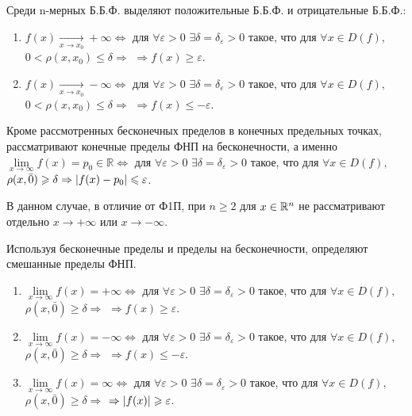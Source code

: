 Среди n-мерных Б.Б.Ф. выделяют положительные Б.Б.Ф. и отрицательные Б.Б.Ф.:
\begin{enumerate}
	\item $f(x) \xrightarrow[x \to x_0]{} +\infty \Leftrightarrow $ для $\forall \varepsilon > 0$ $\exists \delta = \delta_{\varepsilon} > 0$ такое, что для $\forall x \in D(f),$  $0 < \rho(x, x_0) \leqslant \delta \Rightarrow$ $\Rightarrow f(x) \geqslant \varepsilon$.
	\item $f(x) \xrightarrow[x \to x_0]{} -\infty \Leftrightarrow $ для $\forall \varepsilon > 0$ $\exists \delta = \delta_{\varepsilon} > 0$ такое, что для $\forall x \in D(f),$  $0 < \rho(x, x_0) \leqslant \delta \Rightarrow$ $\Rightarrow f(x) \leqslant -\varepsilon$.
\end{enumerate}

\newpage

Кроме рассмотренных бесконечных пределов в конечных предельных точках, рассматривают конечные пределы ФНП на бесконечности, а именно $\lim\limits_{x \to \infty} f(x) = p_0 \in \mathbb{R} \Leftrightarrow$ для $\forall \varepsilon > 0$ $\exists \delta = \delta_{\varepsilon} > 0$ такое, что для $\forall x \in D(f),$ $\rho(x, \bar{0}) \geqslant \delta \Rightarrow \left\lvert f(x) - p_0 \right\rvert \leqslant \varepsilon$.

В данном случае, в отличие от Ф1П, при $n \geqslant 2$ для $x \in \mathbb{R}^n$ не рассматривают отдельно  $x \to + \infty$ или $x \to - \infty$.

Используя бесконечные пределы и пределы на бесконечности, определяют смешанные пределы ФНП.
\begin{enumerate}
	\item $\lim\limits_{x \to \infty} f(x) = +\infty \Leftrightarrow$ для $\forall \varepsilon > 0$ $\exists \delta = \delta_{\varepsilon} > 0$ такое, что для $\forall x \in D(f),$ $\rho(x, \bar{0}) \geqslant \delta \Rightarrow$ $\Rightarrow f(x) \geqslant \varepsilon$.
	\item $\lim\limits_{x \to \infty} f(x) = -\infty \Leftrightarrow$ для $\forall \varepsilon > 0$ $\exists \delta = \delta_{\varepsilon} > 0$ такое, что для $\forall x \in D(f),$ $\rho(x, \bar{0}) \geqslant \delta \Rightarrow$ $\Rightarrow f(x) \leqslant -\varepsilon$.
	\item $\lim\limits_{x \to \infty} f(x) = \infty \Leftrightarrow$ для $\forall \varepsilon > 0$ $\exists \delta = \delta_{\varepsilon} > 0$ такое, что для $\forall x \in D(f),$ $\rho(x, \bar{0}) \geqslant \delta \Rightarrow$ $\Rightarrow \left\lvert f(x) \right\rvert \geqslant \varepsilon$.
\end{enumerate}

